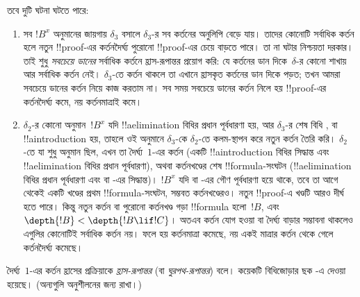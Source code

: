 \documentclass[../../../include/open-logic-section]{subfiles}
\begin{document}
তবে দুটি ঘটনা ঘটতে পারে:
\begin{enumerate}
  \item সব $!B^x$ অনুমানের জায়গায়
  $\delta_3$ বসালে
  $\delta_3$-র সব কর্তনের
  অনুলিপি বেড়ে যায়। তাদের
  কোনোটি সর্বাধিক কর্তন হলে
  নতুন !!{proof}-এর
  কর্তনদৈর্ঘ্য পুরোনো
  !!{proof}-এর চেয়ে বাড়তে পারে।
  তা না ঘটার নিশ্চয়তা দরকার।
  তাই শুধু \emph{সবচেয়ে ডানের}
  সর্বাধিক কর্তনে হ্রাস-রূপান্তর
  প্রয়োগ করি: যে কর্তনের
  ডান দিকে~$\delta$-র কোনো
  শাখায় আর সর্বাধিক কর্তন
  নেই। $\delta_3$-তে কর্তন
  থাকলে তা এখানে হ্রাসকৃত
  কর্তনের ডান দিকে পড়ত;
  তখন আমরা সবচেয়ে ডানের
  কর্তন নিয়ে কাজ করতাম না।
  সব সময় সবচেয়ে ডানের
  কর্তন নিলে হয় !!{proof}-এর
  কর্তনদৈর্ঘ্য কমে, নয়
  কর্তনমাত্রাই কমে।
  \item $\delta_2$-র কোনো
  অনুমান~$!B^x$ যদি
  !!a{elimination} বিধির
  প্রধান পূর্বধারণা হয়,
  আর $\delta_3$-র শেষ বিধি
  \Elim{\lor}, \Elim{\lexists}
  বা !!a{introduction} হয়,
  তাহলে ওই অনুমানে
  $\delta_3$-কে $\delta_2$-তে
  কলম-স্থাপন করে নতুন
  কর্তন তৈরি করি।
  $\delta_2$-তে যা শুধু
  অনুমান ছিল, এখন তা
  দৈর্ঘ্য~$1$-এর কর্তন
  (একটি !!a{introduction}
  বিধির সিদ্ধান্ত এবং
  !!a{elimination} বিধির
  প্রধান পূর্বধারণা),
  অথবা কর্তনখণ্ডের শেষ
  !!{formula}-সংঘটন
  (!!a{elimination} বিধির
  প্রধান পূর্বধারণা এবং
  \Elim{\lor} বা
  \Elim{\lexists}-এর সিদ্ধান্ত)।
  $!B^x$ যদি \Elim{\lor}
  বা \Elim{\lexists}-এর
  গৌণ পূর্বধারণা হয়ে থাকে,
  তবে তা আগে থেকেই একটি
  খণ্ডের প্রথম !!{formula}-সংঘটন,
  সম্ভবত কর্তনখণ্ডেরও।
  নতুন !!{proof}-এ খণ্ডটি
  আরও দীর্ঘ হতে পারে।
  কিন্তু নতুন কর্তন বা পুরোনো
  কর্তনখণ্ড গড়া !!{formula}
  হলো~$!B$, এবং
  $\depth{!B} < \depth{!B \lif !C}$।
  অতএব কর্তন যোগ হওয়া বা
  দৈর্ঘ্য বাড়ার সম্ভাবনা
  থাকলেও এগুলির কোনোটিই
  সর্বাধিক কর্তন নয়।
  ফলে হয় কর্তনমাত্রা কমেছে,
  নয় একই মাত্রার কর্তন
  থেকে গেলে কর্তনদৈর্ঘ্য কমেছে।
\end{enumerate}

দৈর্ঘ্য~$1$-এর কর্তন হ্রাসের
প্রক্রিয়াকে \emph{হ্রাস-রূপান্তর}
(বা \emph{ঘুরপথ-রূপান্তর}) বলে।
কয়েকটি বিধিজোড়ার ছক
-এ
দেওয়া হয়েছে। (অন্যগুলি
অনুশীলনের জন্য রাখা।)
\end{document}
